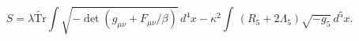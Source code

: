 \begin{equation} \label{det} S=\lambda \widetilde{\mathrm{Tr}}\int
\sqrt{-\det(g_{\mu\nu}+F_{\mu\nu}/\beta)}\,d^4 x
 - \kappa^2 \int\, (R_5+2\Lambda_5)\sqrt{-g_{5}}\,d^5x.
\end{equation}

